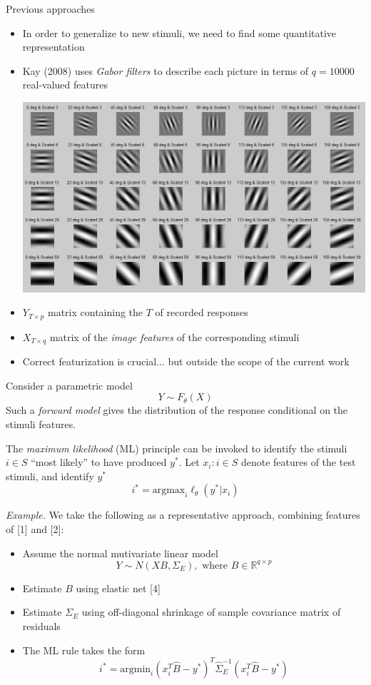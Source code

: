 \documentclass[final]{beamer}
\newlength{\onecolwid}
\begin{document}
\begin{frame}[t]
\begin{columns}[t]
\begin{column}{\onecolwid}
\begin{block}{Previous approaches}
\begin{itemize}
\item In order to generalize to new stimuli, we need to find some quantitative representation
\item Kay (2008) uses \emph{Gabor filters} to describe each picture in terms of $q = 10000$ real-valued features
\begin{center}\includegraphics[scale = 0.7, trim = 0in 2.5in 0in 0in, clip]{gabor.png}
\end{center}
\item $Y_{T \times p}$ matrix containing the $T$ of recorded responses
\item $X_{T \times q}$ matrix of the \emph{image features} of the corresponding stimuli
\item Correct featurization is crucial... but outside the scope of the current work
\end{itemize}

Consider a parametric model
\[
Y \sim F_\theta(X)
\]
Such a \emph{forward model} gives the distribution of the
response conditional on the stimuli features.

The \emph{maximum likelihood} (ML) principle can be invoked to
identify the stimuli $i \in S$ ``most likely'' to have produced $y^*$.
Let $x_i : i \in S$ denote features of the test stimuli, and
identify $y^*$
\[
i^* = \text{argmax}_i \ell_\theta(y^*| x_i)
\]

\emph{Example.} We take the following as a representative approach, combining features of [1] and [2]:
\begin{itemize}
\item Assume the normal mutivariate linear model
\[Y \sim N( XB , \Sigma_E), \text{ where }B \in \mathbb{R}^{q \times p}\]
\item Estimate $B$ using elastic net [4]
\item Estimate $\Sigma_E$ using off-diagonal shrinkage of sample covariance matrix of residuals
\item The ML rule takes the form
\begin{equation}\label{mlrule}
i^* = \text{argmin}_{i} (x_i^T \hat{B} - y^*)^T \hat{\Sigma}_E^{-1} (x_i^T \hat{B} - y^*)
\end{equation}
\end{itemize}
\end{block}


\end{column}
\end{columns}
\end{frame}
\end{document}
